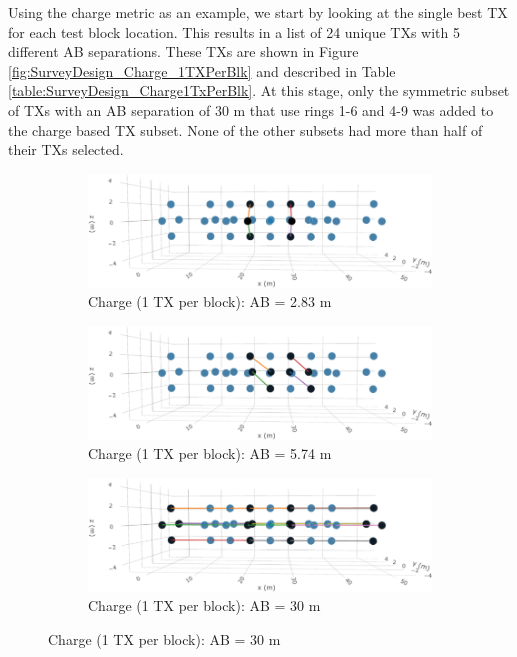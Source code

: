 \documentclass[preprint,authoryear,12pt]{elsarticle}
\begin{document}
Using the charge metric as an example, we start by looking at the single best TX for each test block location. This results in a list of 24 unique TXs with 5 different AB separations. These TXs are shown in Figure \ref{fig:SurveyDesign_Charge_1TXPerBlk} and described in Table \ref{table:SurveyDesign_Charge1TxPerBlk}. At this stage, only the symmetric subset of TXs with an AB separation of 30 m that use rings 1-6 and 4-9 was added to the charge based TX subset. None of the other subsets had more than half of their TXs selected.


\begin{figure} [htp]
   \begin{center}
      \begin{subfigure}{0.6\linewidth}
         \includegraphics[trim=0cm 0cm 0cm 0cm, clip=true, width=\linewidth]{./figures/Fig19a.png}
         \caption{Charge (1 TX per block): AB = 2.83 m}
         \label{fig:SurveyDesign_Charge_1TxPerBlk_AB_2o83m}
      \end{subfigure}

      \begin{subfigure}{0.6\linewidth}
         \includegraphics[trim=0cm 0cm 0cm 0cm, clip=true, width=\linewidth]{./figures/Fig19b.png}
         \caption{Charge (1 TX per block): AB = 5.74 m}
         \label{fig:SurveyDesign_Charge_1TxPerBlk_AB_5o74m}
      \end{subfigure}

      \begin{subfigure}{0.6\linewidth}
         \includegraphics[trim=0cm 0cm 0cm 0cm, clip=true, width=\linewidth]{./figures/Fig19c.png}
         \caption{Charge (1 TX per block): AB = 30 m}
         \label{fig:SurveyDesign_Charge_1TxPerBlk_AB_30m}
      \end{subfigure}


\end{center}
\end{figure}
\end{document}
